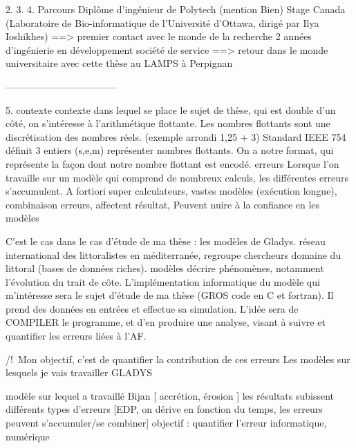 \documentclass[a4paper,11pt]{report}
\begin{document}
 
2.
3.
4. Parcours
Diplôme d’ingénieur de Polytech (mention Bien)
Stage Canada (Laboratoire de Bio-informatique de l’Université d’Ottawa, dirigé par Ilya Ioshikhes)
==> premier contact avec le monde de la recherche
2 années d’ingénierie en développement société de service
==> retour dans le monde universitaire avec cette thèse au LAMPS à Perpignan

-----------------------------------


5. contexte
contexte dans lequel se place le sujet de thèse, qui est double
d’un côté, on s’intéresse à l’arithmétique flottante. Les nombres flottants sont une discrétisation des nombres réels. (exemple arrondi 1,25 + 3)
Standard IEEE 754 définit 3 entiers (s,e,m) représenter nombres flottants. On a notre format, qui représente la façon dont notre nombre flottant est encodé.
erreurs
Lorsque l’on travaille sur un modèle qui comprend de nombreux calculs, les différentes erreurs s’accumulent.
A fortiori super calculateurs, vastes modèles (exécution longue), combinaison erreurs, affectent résultat, Peuvent nuire à la confiance en les modèles

C’est le cas dans le cas d’étude de ma thèse : les modèles de Gladys.
réseau international des littoralistes en méditerranée, regroupe chercheurs domaine du littoral (bases de données riches).
modèles décrire phénomènes, notamment l’évolution du trait de côte.
L’implémentation informatique du modèle qui m’intéresse sera le sujet d’étude de ma thèse (GROS code en C et fortran). Il prend des données en entrées et effectue sa simulation.
L’idée sera de COMPILER le programme, et d’en produire une analyse, visant à suivre et quantifier les erreurs liées à l’AF.

/!\ Mon objectif, c’est de quantifier la contribution de ces erreurs 
Les modèles sur lesquels je vais travailler GLADYS

modèle sur lequel a travaillé Bijan         [ accrétion, érosion ]
les résultats subissent différents types d’erreurs [EDP, on dérive en fonction du temps, les erreurs peuvent s’accumuler/se combiner]
objectif : quantifier l’erreur informatique, numérique
\end{document}
